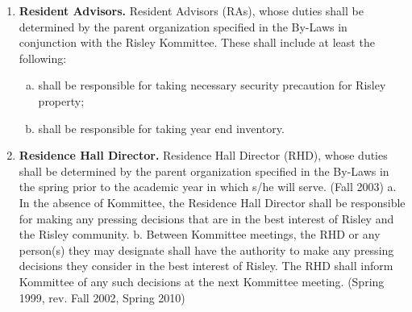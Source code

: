 \documentclass[12pt]{article}
\begin{document}
\begin{enumerate}[A.]
\begin{enumerate}[A.]
\begin{enumerate}[1.]
\item \textbf{Resident Advisors.} Resident Advisors (RAs), whose duties shall be determined by the parent organization specified in the By-Laws in conjunction with the Risley Kommittee. These shall include at least the following:
\begin{enumerate}[a.]
\item shall be responsible for taking necessary security precaution for Risley property;
\item shall be responsible for taking year end inventory.
\end{enumerate}
\item \textbf{Residence Hall Director.} Residence Hall Director (RHD), whose duties shall be determined by the parent organization specified in the By-Laws in the spring prior to the academic year in which s/he will serve. (Fall 2003) a. In the absence of Kommittee, the Residence Hall Director shall be responsible for making any pressing decisions that are in the best interest of Risley and the Risley community. b. Between Kommittee meetings, the RHD or any person(s) they may designate shall have the authority to make any pressing decisions they consider in the best interest of Risley. The RHD shall inform Kommittee of any such decisions at the next Kommittee meeting. (Spring 1999, rev. Fall 2002, Spring 2010)


\end{enumerate}
\end{enumerate}
\end{enumerate}
\end{document}
